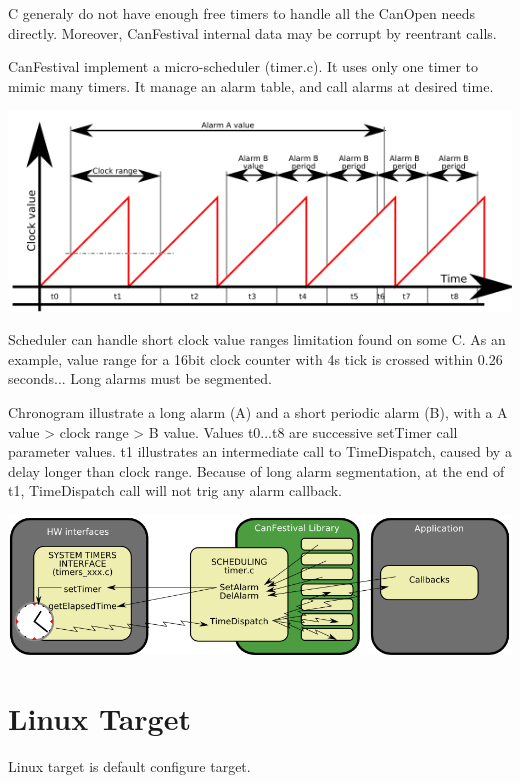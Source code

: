 \documentclass[12pt,twoside]{article}
\begin{document}
{\textmu}C generaly do not have enough free timers to handle all the
CanOpen needs directly. Moreover, CanFestival internal data may be
corrupt by reentrant calls. 

CanFestival implement a micro{}-scheduler (timer.c). It uses only one
timer to mimic many timers. It manage an alarm table, and call alarms
at desired time.

\begin{center}
   \includegraphics[width=20cm]{Pictures/100000000000022C000000DEDAD2140C.png}
\end{center}

Scheduler can handle short clock value ranges limitation found on some
{\textmu}C. As an example, value range for a 16bit clock counter with
4{\textmu}s tick is crossed within 0.26 seconds... Long alarms must be
segmented.

Chronogram illustrate a long alarm (A) and a short periodic alarm (B),
with a A value {\textgreater} clock range {\textgreater} B value.
Values t0...t8 are successive setTimer call parameter values. t1
illustrates an intermediate call to TimeDispatch, caused by a delay
longer than clock range. Because of long alarm segmentation, at the end
of t1, TimeDispatch call will not trig any alarm callback.

\begin{center}
   \includegraphics[width=20cm]{Pictures/1000000000000396000000FFC42573DA.png}
\end{center}

\section{Linux Target}
Linux target is default configure target.
\end{document}
